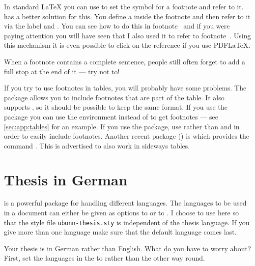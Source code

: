 In standard \LaTeX{} you can use
 to set the symbol for a
footnote and refer to it. \KOMAScript{} has a better solution for
this. You define a  inside the footnote and
then refer to it via the label and . You
can see how to do this in footnote~ and if you were
paying attention you will have seen that I also used it to refer to
footnote~. Using this mechanism it is even
possible to click on the reference if you use PDF\LaTeX.

When a footnote contains a complete sentence, people still often
forget to add a full stop at the end of it --- try not to!

If you try to use footnotes in tables, you will probably have some
problems. The  package allows you to include footnotes
that are part of the table. It also supports , so it
should be possible to keep the same format. If you use the package
 you can use the environment  
instead of  to get footnotes
--- see \cref{sec:app:tables} for an example. 
If you use the  package, use 
rather than  and  in order to easily include
footnotes.
Another recent package () is
 which provides the command
. This is advertised to also work in sideways tables.


\section{Thesis in German}%
\label{sec:layout:german}

 is a powerful package for handling different
languages. The languages to be used in a document can either be given
as options to  or to . I choose to
use  here so that the style file
\texttt{ubonn-thesis.sty} is independent of the thesis language. If
you give more than one language make sure that the default language
comes last.

Your thesis is in German rather than English. What do you have to
worry about? First, set the languages in the  to
 rather than the other way round.

